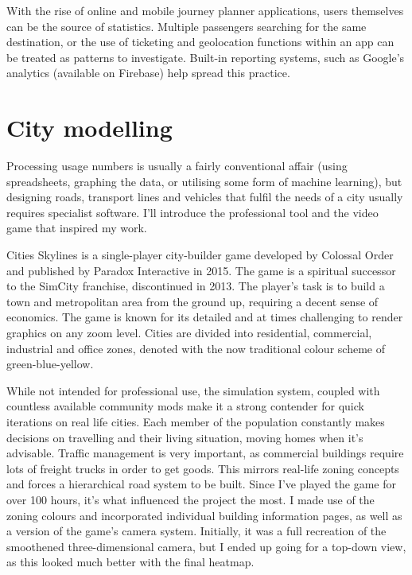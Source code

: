 With the rise of online and mobile journey planner applications, users themselves can be the source of statistics. Multiple passengers searching for the same destination, or the use of ticketing and geolocation functions within an app can be treated as patterns to investigate. Built-in reporting systems, such as Google's analytics (available on Firebase) help spread this practice.

\section{City modelling}

Processing usage numbers is usually a fairly conventional affair (using spreadsheets, graphing the data, or utilising some form of machine learning), but designing roads, transport lines and vehicles that fulfil the needs of a city usually requires specialist software. I'll introduce the professional tool and the video game that inspired my work.

Cities Skylines is a single-player city-builder game developed by Colossal Order and published by Paradox Interactive in 2015. The game is a spiritual successor to the SimCity franchise, discontinued in 2013. The player's task is to build a town and metropolitan area from the ground up, requiring a decent sense of economics. The game is known for its detailed and at times challenging to render graphics on any zoom level. Cities are divided into residential, commercial, industrial and office zones, denoted with the now traditional colour scheme of green-blue-yellow.

While not intended for professional use, the simulation system, coupled with countless available community mods make it a strong contender for quick iterations on real life cities. Each member of the population constantly makes decisions on travelling and their living situation, moving homes when it's advisable. Traffic management is very important, as commercial buildings require lots of freight trucks in order to get goods. This mirrors real-life zoning concepts and forces a hierarchical road system to be built. Since I've played the game for over 100 hours, it's what influenced the project the most. I made use of the zoning colours and incorporated individual building information pages, as well as a version of the game's camera system. Initially, it was a full recreation of the smoothened three-dimensional camera, but I ended up going for a top-down view, as this looked much better with the final heatmap.

